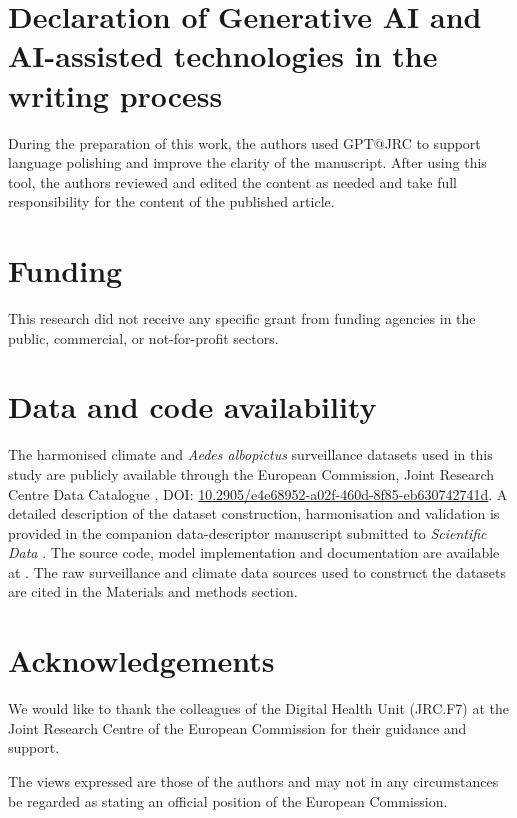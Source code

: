 \documentclass[preprint,12pt]{elsarticle}
\begin{document}
\section*{Declaration of Generative AI and AI-assisted technologies in the writing process}

During the preparation of this work, the authors used GPT@JRC to support
language polishing and improve the clarity of the manuscript. After using
this tool, the authors reviewed and edited the content as needed and take
full responsibility for the content of the published article.

\section*{Funding}

This research did not receive any specific grant from funding agencies
in the public, commercial, or not-for-profit sectors.

\section*{Data and code availability}

The harmonised climate and \textit{Aedes albopictus} surveillance datasets
used in this study are publicly available through the European Commission,
Joint Research Centre Data Catalogue \cite{biazzo2026_datasets_doi}, DOI:
\href{https://doi.org/10.2905/e4e68952-a02f-460d-8f85-eb630742741d}
{10.2905/e4e68952-a02f-460d-8f85-eb630742741d}.
A detailed description of the dataset construction, harmonisation and
validation is provided in the companion data-descriptor manuscript submitted
to \textit{Scientific Data} \cite{biazzo2026_datasets}.
The source code, model implementation and documentation are available at
\cite{github2024aiedes}. The raw surveillance and climate data sources
used to construct the datasets are cited in the Materials and methods section.



\section*{Acknowledgements}
We would like to thank the colleagues of the Digital Health Unit (JRC.F7) at the Joint Research Centre of the European Commission for their guidance and support. 

The views expressed are those of the authors and may not in any circumstances be regarded as stating an official position of the European Commission. 



\end{document}
